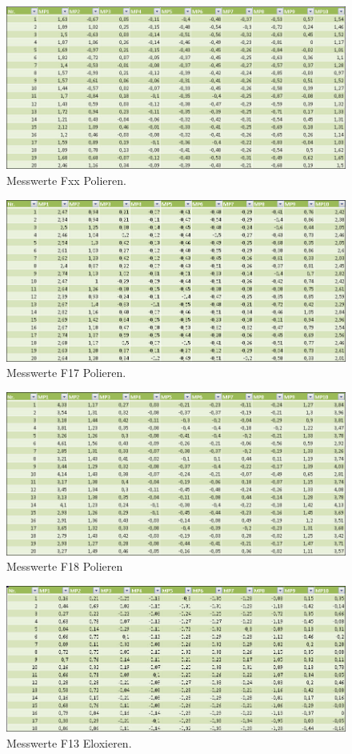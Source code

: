 \begin{figure}[H]
\centering
\includegraphics[width=.8\textwidth]{Fxxpolier}
\caption{Messwerte Fxx Polieren.}
\label{Fxxpolier}
\end{figure}
\begin{figure}[H]
\centering
\includegraphics[width=.8\textwidth]{F17polier}
\caption{Messwerte F17 Polieren.}
\label{F17polier}
\end{figure}
\begin{figure}[H]
\centering
\includegraphics[width=.8\textwidth]{F18polier}
\caption{Messwerte F18 Polieren}
\label{F18polier}
\end{figure}
\begin{figure}[H]
\centering
\includegraphics[width=.8\textwidth]{F13elox}
\caption{Messwerte F13 Eloxieren.}
\label{F13elox}
\end{figure}
